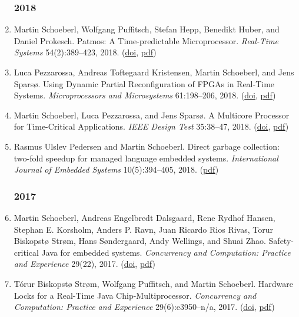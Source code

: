 \begin{enumerate}
\subsubsection*{2018}

\item Martin Schoeberl, Wolfgang Puffitsch, Stefan Hepp, Benedikt Huber, and Daniel Prokesch.
 Patmos: A Time-predictable Microprocessor.
 \emph{Real-Time Systems} 54(2):389--423, 2018.
(\href{http://dx.doi.org/10.1007/s11241-018-9300-4}{doi}, \href{https://www.jopdesign.com/doc/patmos.pdf}{pdf})

\item Luca Pezzarossa, Andreas Toftegaard Kristensen, Martin Schoeberl, and Jens Spars{\o}.
 Using Dynamic Partial Reconfiguration of FPGAs in Real-Time Systems.
 \emph{Microprocessors and Microsystems} 61:198--206, 2018.
(\href{http://dx.doi.org/https://doi.org/10.1016/j.micpro.2018.05.017}{doi}, \href{https://www.jopdesign.com/doc/dpr-hls-jnl.pdf}{pdf})

\item Martin Schoeberl, Luca Pezzarossa, and Jens Spars{\o}.
 A Multicore Processor for Time-Critical Applications.
 \emph{IEEE Design Test} 35:38--47, 2018.
(\href{http://dx.doi.org/10.1109/MDAT.2018.2791809}{doi}, \href{http://www.jopdesign.com/doc/timecritcmp.pdf}{pdf})

\item Rasmus Ulslev Pedersen and Martin Schoeberl.
 Direct garbage collection: two-fold speedup for managed language embedded systems.
 \emph{International Journal of Embedded Systems} 10(5):394--405, 2018.
(\href{https://www.jopdesign.com/doc/gcmem.pdf}{pdf})


\subsubsection*{2017}

\item Martin Schoeberl, Andreas Engelbredt Dalsgaard, Rene Rydhof Hansen, Stephan E. Korsholm, Anders P. Ravn, Juan Ricardo Rios Rivas, Torur Biskopst{\o} Str{\o}m, Hans S{\o}ndergaard, Andy Wellings, and Shuai Zhao.
 Safety-critical Java for embedded systems.
 \emph{Concurrency and Computation: Practice and Experience} 29(22), 2017.
(\href{http://dx.doi.org/10.1002/cpe.3963}{doi}, \href{http://www.jopdesign.com/doc/cj4es-jnl.pdf}{pdf})

\item T{\'o}rur Biskopst{\o} Str{\o}m, Wolfgang Puffitsch, and Martin Schoeberl.
 Hardware Locks for a Real-Time Java Chip-Multiprocessor.
 \emph{Concurrency and Computation: Practice and Experience} 29(6):e3950--n/a, 2017.
(\href{http://dx.doi.org/10.1002/cpe.3950}{doi}, \href{http://www.jopdesign.com/doc/jophwlocks.pdf}{pdf})


\end{enumerate}
